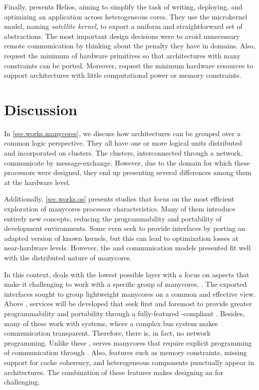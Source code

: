 	Finally,  presents  Helios, aiming to
	simplify the task of writing, deploying, and optimizing an application across
	heterogeneous cores.
	They use the microkernel model, naming \textit{satellite kernel}, to export
	a uniform and straightforward set of \os abstractions.
	The most important design decisions were to avoid unnecessary remote communication
	by thinking about the penalty they have in \numa domains.
	Also, request the minimum of hardware primitives so that architectures with many
	constraints can be ported.
	Moreover, request the minimum hardware resources to support architectures with little
	computational power or memory constraints.

\section{Discussion}

	In \autoref{sec.works.manycores}, we discuss how \manycore architectures can be
	grouped over a common logic perspective.
	They all have one or more logical units distributed and incorporated on clusters.
	The clusters, interconnected through a network, communicate by message-exchange.
	However, due to the domain for which these processors were designed, they end up
	presenting several differences among them at the hardware level.

	Additionally, \autoref{sec.works.os} presents \oss studies that focus
	on the most efficient exploration of manycores processor characteristics.
	Many of them introduce entirely new concepts, reducing the programmability
	and portability of development environments. Some even seek to provide
	\posix interfaces by porting an adapted version of known kernels, but
	this can lead to optimization losses at near-hardware levels.
	However, the \os and communication models presented fit well with the
	distributed nature of manycores.

	In this context, \nanvix \hal deals with the lowest possible layer
	with a focus on aspects that make it challenging to work with a
	specific group of manycores, \ie \lightweight \manycores.
	The exported interfaces sought to group lightweight manycores on a common and effective view.
	Above \hal, services will be developed that seek first and foremost
	to provide greater programmability and portability through a fully-featured
	\posix-compliant \os. Besides, many of these \oss work with \numa systems,
	where a complex bus system makes communication transparent. Therefore, there
	is, in fact, no network programming. Unlike these \oss, \nanvix serves manycores
	that require explicit programming of communication through \noc. Also, features
	such as memory constraints, missing support for cache coherency, and heterogeneous
	components punctually appear in \numa architectures. The combination of these
	features makes designing an \os for \lightweight \manycores challenging.
	